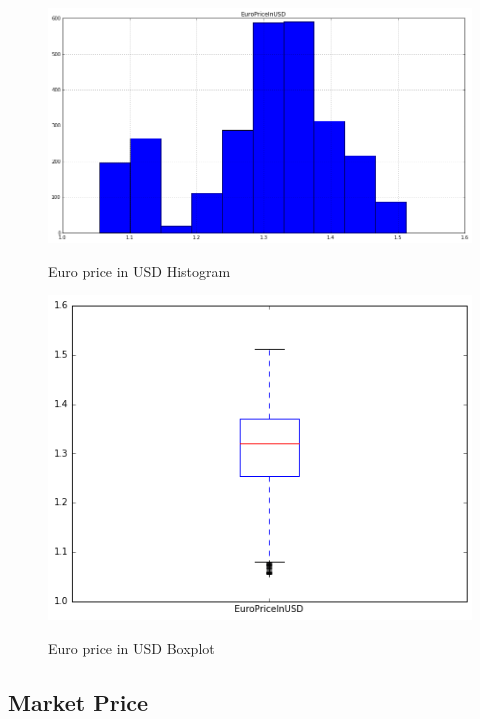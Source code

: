 \begin{figure}[bth]
  \myfloatalign
  {\includegraphics[width=1\linewidth]
    {gfx/euro-price-in-usd-histogram}} 
  \caption{Euro price in USD Histogram}
  \label{fig:euro-price-in-usd-histogram}
\end{figure}

\begin{figure}[bth]
  \myfloatalign
  {\includegraphics[width=1\linewidth]
    {gfx/euro-price-in-usd-boxplot}}
  \caption{Euro price in USD Boxplot}
  \label{fig:euro-price-in-usd-boxplot}
\end{figure}

\clearpage


\subsection{Market Price}
\label{sec:market-price}

